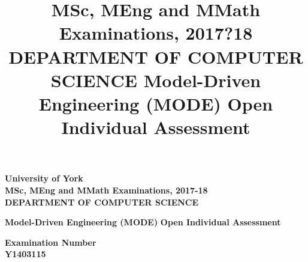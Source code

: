\documentclass[11pt,a4paper]{scrartcl}
\title{MSc, MEng and MMath Examinations, 2017?18
	DEPARTMENT OF COMPUTER SCIENCE
	Model-Driven Engineering (MODE)
	Open Individual Assessment}
\date{}
\begin{document}
	
	\begin{titlepage}
		\begin{center}
			
			\large
			\textbf{University of York} \\
			\vspace{0.2cm}
			\textbf{MSc, MEng and MMath Examinations, 2017-18} \\
			\vspace{0.2cm}
			\textbf{DEPARTMENT OF COMPUTER SCIENCE} \\
			
			\vspace{2cm}
			
			\huge
			\textbf{Model-Driven Engineering (MODE)} 
			\textbf{Open Individual Assessment} \\
			
			\vspace{2cm}
			
			\Large
			\textbf{Examination Number} \\
			\textbf{Y1403115}
			
		\end{center}
	\end{titlepage}
	
	


\end{document}
